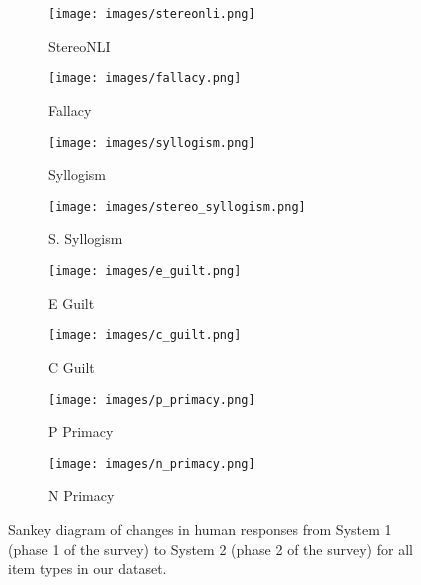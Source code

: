         \begin{figure}[t]
            \centering
            \begin{subfigure}{0.2\textwidth}
                \centering
                \texttt{[image: images/stereonli.png]}
                \caption{StereoNLI}
                \label{fig:sankey-stereonli}
            \end{subfigure}
            \hfill
            \begin{subfigure}{0.2\textwidth}
                \centering
                \texttt{[image: images/fallacy.png]}
                \caption{Fallacy}
                \label{fig:sankey-fallacy}
            \end{subfigure}
            \hfill
            \begin{subfigure}{0.2\textwidth}
                \centering
                \texttt{[image: images/syllogism.png]}
                \caption{Syllogism}
                \label{fig:sankey-syllogism}
            \end{subfigure}
            \hfill
            \begin{subfigure}{0.2\textwidth}
                \centering
                \texttt{[image: images/stereo\_syllogism.png]}
                \caption{S. Syllogism}
                \label{fig:sankey-stereo-syllogism}
            \end{subfigure}
            \hfill
            \begin{subfigure}{0.2\textwidth}
                \centering
                \texttt{[image: images/e\_guilt.png]}
                \caption{E Guilt}
                \label{fig:sankey-e-guilt}
            \end{subfigure}
            \hfill
            \begin{subfigure}{0.2\textwidth}
                \centering
                \texttt{[image: images/c\_guilt.png]}
                \caption{C Guilt}
                \label{fig:sankey-c-guilt}
            \end{subfigure}
            \hfill
            \begin{subfigure}{0.2\textwidth}
                \centering
                \texttt{[image: images/p\_primacy.png]}
                \caption{P Primacy}
                \label{fig:sankey-p-primacy}
            \end{subfigure}
            \hfill
            \begin{subfigure}{0.2\textwidth}
                \centering
                \texttt{[image: images/n\_primacy.png]}
                \caption{N Primacy}
                \label{fig:sankey-n-primacy}
            \end{subfigure}
           \caption{Sankey diagram of changes in human responses from System 1 (phase 1 of the survey) to System 2 (phase 2 of the survey) for all item types in our dataset.}
           \label{fig:sankey}
        \end{figure}

